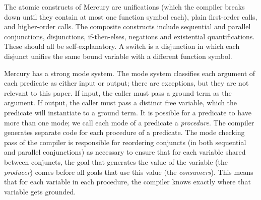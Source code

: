\noindent
The atomic constructs of Mercury are unifications
(which the compiler breaks down until they contain
at most one function symbol each),
plain first-order calls,
and higher-order calls.
The composite constructs include
sequential and parallel conjunctions,
disjunctions, if-then-elses, negations and existential quantifications.
These should all be self-explanatory.
A switch is a disjunction in which
each disjunct unifies the same bound variable
with a different function symbol.


Mercury  has a strong mode system.
The mode system classifies each argument of each predicate
as either input or output;
there are exceptions, but they are not relevant to this paper.
If input, the caller must pass a ground term as the argument.
If output, the caller must pass a distinct free variable,
which the predicate will instantiate to a ground term.
It is possible for a predicate to have more than one mode;
we call each mode of a predicate a \emph{procedure}.
The  compiler generates separate code
for each procedure of a predicate.
The mode checking pass of the compiler is responsible for
reordering conjuncts (in both sequential and parallel conjunctions)
as necessary to ensure that for each variable shared between conjuncts,
the goal that generates the value of the variable (the \emph{producer})
comes before all goals that use this value (the \emph{consumers}).
This means that for each variable in each procedure,
the compiler knows exactly where that variable gets grounded.

